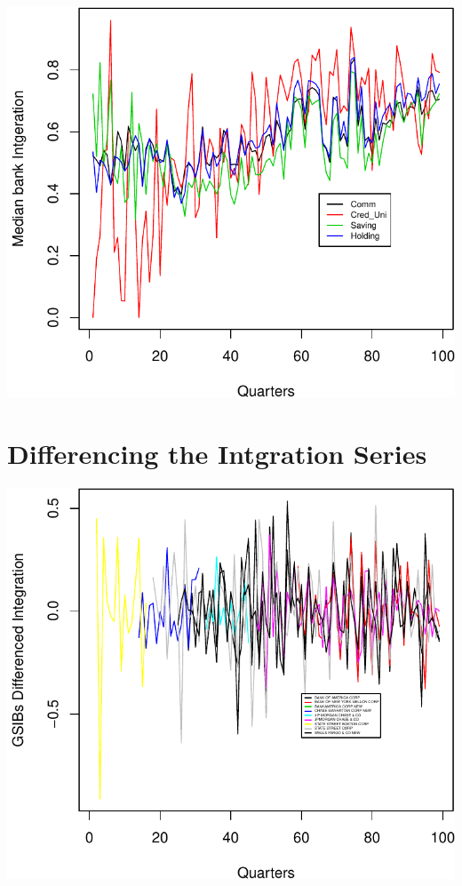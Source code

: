 \documentclass[11pt,]{article}
\begin{document}
\begin{center}\includegraphics{AC_US_Bank_Int_Results_1_files/figure-latex/SIC_Categ-1} \end{center}

\section{Differencing the Intgration
Series}\label{differencing-the-intgration-series}

\begin{center}\includegraphics{AC_US_Bank_Int_Results_1_files/figure-latex/Diff-1} \end{center}
\end{document}
